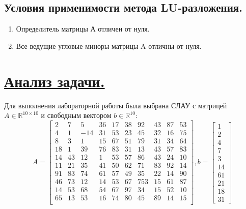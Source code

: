 \documentclass[a4paper, 12pt]{article}
\begin{document}
	\subsection{Условия применимости метода LU-разложения.}
	
	\begin{enumerate}
		\item Определитель матрицы А отличен от нуля.
		\item Все ведущие угловые миноры матрицы A отличны от нуля.
	\end{enumerate}

	\section{\underline{Анализ задачи.}}
	
	Для выполнения лабораторной работы была выбрана СЛАУ с матрицей $A\in\mathbb{R}^{10\times10}$ и свободным вектором $b\in\mathbb{R}^{10}$:
	\begin{equation}
		\label{A_matrix}
		A=
		\begin{bmatrix}
			2 & 7 & 5 & 36 & 17 & 38 & 92 & 43 & 87 & 53 \\
			4 & 1 & -14 & 31 & 53 & 23 & 45 & 32 & 16 & 75 \\
			8 & 3 & 1 & 15& 67& 51& 79& 31& 34& 64 \\
			18 & 1 & 39 & 76 & 83 & 31 & 13 & 43 & 57 & 83 \\
			14 & 43 & 12 & 1 & 53 & 57 & 86 & 43 & 24 & 10 \\
			11 & 21 & 35 & 41 & 50 & 62 & 71 & 83 & 92 & 14 \\
			91 & 83 & 74 & 61 & 57 & 49 & 35 & 22 & 14 & 90 \\
			46 & 73 & 12 & 14 & 53 & 67 & 753 & 15 & 61 & 87 \\
			14 & 53 & 68 & 54 & 67 & 97 & 34 & 15 & 52 & 10 \\
			65 & 13 & 53 & 16 & 74 & 80 & 45 & 89 & 14 & 15 \\
		\end{bmatrix},
		b=
		\begin{bmatrix}
			1 \\ 2 \\ 4 \\ 7 \\ 3 \\ 14 \\ 61 \\ 21 \\ 18 \\ 31
		\end{bmatrix}
	\end{equation} 
	
\end{document}
